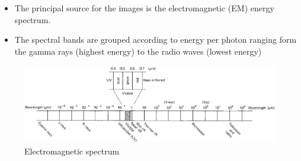 \documentclass[10pt,dvipsnames,ignorenonframetext,aspectratio=169]{beamer}
\providecommand{\tightlist}{%
  \setlength{\itemsep}{0pt}\setlength{\parskip}{0pt}}
\begin{document}
\begin{frame}{}
\protect\hypertarget{section}{}
\begin{itemize}
\tightlist
\item
  The principal source for the images is the electromagnetic (EM) energy
  spectrum.
\item
  The spectral bands are grouped according to energy per photon ranging
  form the gamma rays (highest energy) to the radio waves (lowest
  energy)
\end{itemize}

\begin{figure}
\includegraphics[width=0.85\linewidth]{../images/spectral_bands_electromagnetic_wavelength} \caption{Electromagnetic spectrum}\label{fig:electromagnetic-spectrum}
\end{figure}
\end{frame}
\end{document}
